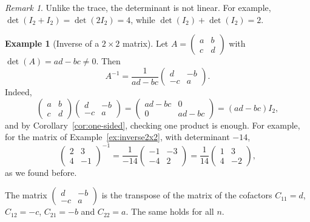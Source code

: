 \documentclass[11pt]{article}
\theoremstyle{definition}
\newtheorem{example}[definition]{Example}
\theoremstyle{plain}
\theoremstyle{remark}
\newtheorem{remark}[definition]{Remark}
\begin{document}
\begin{remark}
    Unlike the trace, the determinant is not linear. For example, $\det(I_2 + I_2) = \det(2I_2) = 4$, while $\det(I_2) + \det(I_2) = 2$.
\end{remark}

\begin{example}[Inverse of a $2 \times 2$ matrix]
    Let $A = \begin{pmatrix} a & b \\ c & d \end{pmatrix}$ with $\det(A) = ad - bc \neq 0$. Then
    \[A^{-1} = \frac{1}{ad - bc} \begin{pmatrix}
        d & -b \\
        -c & a
    \end{pmatrix}.\]
    Indeed,
    \[\begin{pmatrix}
        a & b \\
        c & d
    \end{pmatrix} \begin{pmatrix}
        d & -b \\
        -c & a
    \end{pmatrix} = \begin{pmatrix}
        ad - bc & 0 \\
        0 & ad - bc
    \end{pmatrix} = (ad - bc) I_2,\]
    and by Corollary~\ref{cor:one-sided}, checking one product is enough. For example, for the matrix of Example~\ref{ex:inverse2x2}, with determinant $-14$,
    \[\begin{pmatrix}
        2 & 3 \\
        4 & -1
    \end{pmatrix}^{-1} = \frac{1}{-14} \begin{pmatrix}
        -1 & -3 \\
        -4 & 2
    \end{pmatrix} = \frac{1}{14} \begin{pmatrix}
        1 & 3 \\
        4 & -2
    \end{pmatrix},\]
    as we found before.
\end{example}

The matrix $\begin{pmatrix} d & -b \\ -c & a \end{pmatrix}$ is the transpose of the matrix of the cofactors $C_{11} = d$, $C_{12} = -c$, $C_{21} = -b$ and $C_{22} = a$. The same holds for all $n$.
\end{document}
